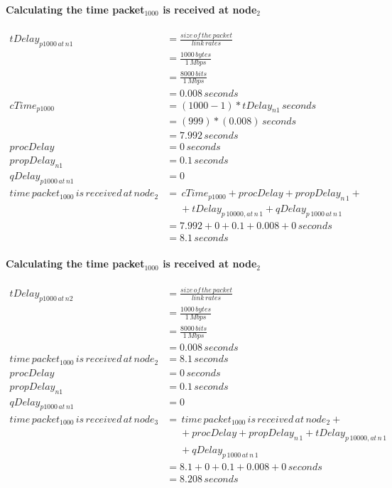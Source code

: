 \documentclass[fleqn,11pt]{article}
\begin{document}
\paragraph{Calculating the time packet$_{1000}$ is received at node$_2$ }
\begin{align*}
tDelay_{p1000\,at\,n1} &=  \frac{size\,of\,the\,packet} {link\,rates}\\
&= \frac{1000\,bytes} {1\,Mbps}\\
&=  \frac{8000\,bits} {1\,Mbps}\\
&= 0.008 \,seconds\\
cTime_{p1000} &= (1000-1) *tDelay_{n1}\,seconds\\
&= (999) *(0.008)\,seconds\\
&= 7.992\,seconds\\
procDelay &= 0\,seconds\\
propDelay_{n1} &= 0.1\,seconds\\
qDelay_{p1000\,at\,n1} &= 0\\
time\,packet_{1000}\,is\,received\,at\,node_{2} &= \,cTime_{p1000} + procDelay + propDelay_{n\,1} +\\
&\,\,\,\,\,\,\,\, + tDelay_{p\,10000,at\,n\,1} + qDelay_{p\,1000\,at\,n\,1}\\
&= 7.992 + 0 + 0.1 + 0.008 + 0\,seconds\\
&= 8.1\,seconds
\end{align*}

\paragraph{Calculating the time packet$_{1000}$ is received at node$_2$ }
\begin{align*}
tDelay_{p1000\,at\,n2} &=  \frac{size\,of\,the\,packet} {link\,rates}\\
&= \frac{1000\,bytes} {1\,Mbps}\\
&=  \frac{8000\,bits} {1\,Mbps}\\
&= 0.008 \,seconds\\
time\,packet_{1000}\,is\,received\,at\,node_{2} &= 8.1\,seconds\\
procDelay &= 0\,seconds\\
propDelay_{n1} &= 0.1\,seconds\\
qDelay_{p1000\,at\,n1} &= 0\\
time\,packet_{1000}\,is\,received\,at\,node_{3} &= \,time\,packet_{1000}\,is\,received\,at\,node_{2} + \\
&\,\,\,\,\,\,\,\, + procDelay + propDelay_{n\,1} + tDelay_{p\,10000,at\,n\,1} \\
&\,\,\,\,\,\,\,\, + qDelay_{p\,1000\,at\,n\,1}\\
&= 8.1 + 0 + 0.1 + 0.008 + 0\,seconds\\
&= 8.208\,seconds
\end{align*}
\end{document}
